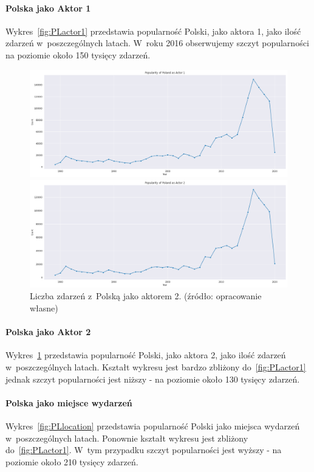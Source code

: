 \documentclass[11pt]{report}
\begin{document}
    \paragraph{Polska jako Aktor 1}
    Wykres~\ref{fig:PLactor1} przedstawia popularność Polski, jako aktora 1, jako ilość zdarzeń w~poszczególnych latach.
    W~roku 2016 obserwujemy szczyt popularności na poziomie około 150 tysięcy zdarzeń.
    \begin{figure}[!htp]
        \centering
        \includegraphics[width=\linewidth]{fig/PL/PLactor1.png}
        \caption{Liczba zdarzeń z~Polską jako aktorem 1. (źródło: opracowanie własne)}
        \label{fig:PLactor1}
        \includegraphics[width=\linewidth]{fig/PL/PLactor2.png}
        \caption{Liczba zdarzeń z~Polską jako aktorem 2. (źródło: opracowanie własne)}
        \label{fig:PLactor2}
    \end{figure}

    \paragraph{Polska jako Aktor 2}
    Wykres~\ref{fig:PLactor2} przedstawia popularność Polski, jako aktora 2, jako ilość zdarzeń w~poszczególnych latach.
    Kształt wykresu jest bardzo zbliżony do~\ref{fig:PLactor1} jednak szczyt popularności jest niższy - na poziomie około 130 tysięcy zdarzeń.

    \paragraph{Polska jako miejsce wydarzeń}
    Wykres~\ref{fig:PLlocation} przedstawia popularność Polski jako miejsca wydarzeń w~poszczególnych latach.
    Ponownie kształt wykresu jest zbliżony do~\ref{fig:PLactor1}.
    W~tym przypadku szczyt popularności jest wyższy - na poziomie około 210 tysięcy zdarzeń.
\end{document}
